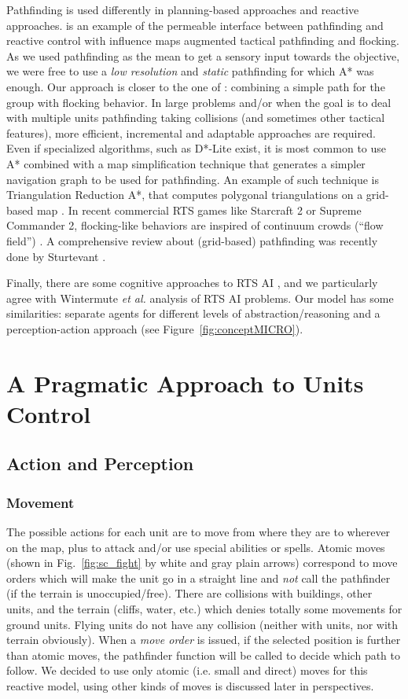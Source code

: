 Pathfinding is used differently in planning-based approaches and reactive approaches. \cite{Danielsiek_2008} is an example of the permeable interface between pathfinding and reactive control with influence maps augmented tactical pathfinding and flocking. As we used pathfinding as the mean to get a sensory input towards the objective, we were free to use a \textit{low resolution} and \textit{static} pathfinding for which A* was enough. Our approach is closer to the one of \citep{Reynolds_1999}: combining a simple path for the group with flocking behavior. In large problems and/or when the goal is to deal with multiple units pathfinding taking collisions (and sometimes other tactical features), more efficient, incremental and adaptable approaches are required. 
Even if specialized algorithms, such as D*-Lite \cite{KoenigL02} exist, it is most common to use A* combined with a map simplification technique that generates a simpler navigation graph to be used for pathfinding. An example of such technique is Triangulation Reduction A*, that computes polygonal triangulations on a grid-based map \cite{Demyen_2006}. In recent commercial RTS games like Starcraft 2 or Supreme Commander 2, flocking-like behaviors are inspired of continuum crowds (``flow field'') \cite{Treuille2006}. A comprehensive review about (grid-based) pathfinding was recently done by Sturtevant \cite{sturtevant2012benchmarks}.


Finally, there are some cognitive approaches to RTS AI \citep{SORTS}, and we particularly agree with Wintermute \textit{et al.} analysis of RTS AI problems. Our model has some similarities: separate agents for different levels of abstraction/reasoning and a perception-action approach (see Figure~\ref{fig:conceptMICRO}).

\section{A Pragmatic Approach to Units Control}
\subsection{Action and Perception}
\subsubsection{Movement}
The possible actions for each unit are to move from where they are to wherever on the map, plus to attack and/or use special abilities or spells. Atomic moves (shown in Fig.~\ref{fig:sc_fight} by white and gray plain arrows) correspond to move orders which will make the unit go in a straight line and \textit{not} call the pathfinder (if the terrain is unoccupied/free). There are collisions with buildings, other units, and the terrain (cliffs, water, etc.) which denies totally some movements for ground units. Flying units do not have any collision (neither with units, nor with terrain obviously). When a \textit{move order} is issued, if the selected position is further than atomic moves, the pathfinder function will be called to decide which path to follow. We decided to use only atomic (i.e. small and direct) moves for this reactive model, using other kinds of moves is discussed later in perspectives.

